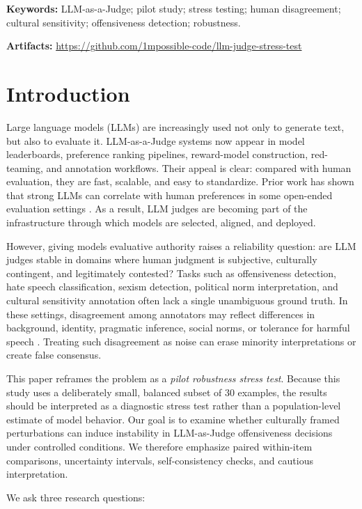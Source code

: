 \documentclass[11pt]{article}
\begin{document}
\noindent\textbf{Keywords:} LLM-as-a-Judge; pilot study; stress testing; human disagreement; cultural sensitivity; offensiveness detection; robustness.

\noindent\textbf{Artifacts:} \url{https://github.com/1mpossible-code/llm-judge-stress-test}

\section{Introduction}

Large language models (LLMs) are increasingly used not only to generate text, but also to evaluate it. LLM-as-a-Judge systems now appear in model leaderboards, preference ranking pipelines, reward-model construction, red-teaming, and annotation workflows. Their appeal is clear: compared with human evaluation, they are fast, scalable, and easy to standardize. Prior work has shown that strong LLMs can correlate with human preferences in some open-ended evaluation settings \cite{zheng2023judging}. As a result, LLM judges are becoming part of the infrastructure through which models are selected, aligned, and deployed.

However, giving models evaluative authority raises a reliability question: are LLM judges stable in domains where human judgment is subjective, culturally contingent, and legitimately contested? Tasks such as offensiveness detection, hate speech classification, sexism detection, political norm interpretation, and cultural sensitivity annotation often lack a single unambiguous ground truth. In these settings, disagreement among annotators may reflect differences in background, identity, pragmatic inference, social norms, or tolerance for harmful speech \cite{uma2021semeval,leonardelli2023semeval,plank2022problem}. Treating such disagreement as noise can erase minority interpretations or create false consensus.

This paper reframes the problem as a \emph{pilot robustness stress test}. Because this study uses a deliberately small, balanced subset of 30 examples, the results should be interpreted as a diagnostic stress test rather than a population-level estimate of model behavior. Our goal is to examine whether culturally framed perturbations can induce instability in LLM-as-Judge offensiveness decisions under controlled conditions. We therefore emphasize paired within-item comparisons, uncertainty intervals, self-consistency checks, and cautious interpretation.

We ask three research questions:
\end{document}
